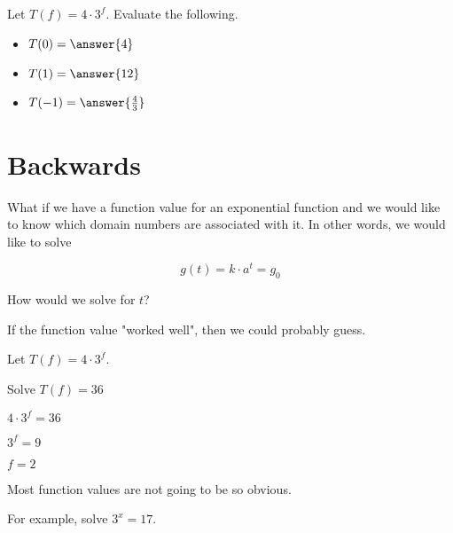 \documentclass{ximera}
\begin{document}
\begin{example}

Let $T(f) = 4 \cdot 3^f$.  Evaluate the following.

\begin{itemize}
\item $T(0) = \answer{4}$ 
\item $T(1) = \answer{12}$
\item $T(-1) = \answer{\frac{4}{3}}$
\end{itemize}
\end{example}























\section{Backwards}

What if we have a function value for an exponential function and we would like to know which domain numbers are associated with it.  In other words, we would like to solve


\[    g(t) = k \cdot a^t  =   g_0    \]


How would we solve for $t$?






\begin{example} If the function value "worked well", then we could probably guess.

Let $T(f) = 4 \cdot 3^f$.  


Solve $T(f) = 36$

$4 \cdot 3^f = 36$

$3^f = 9$

$f = 2$

\end{example}









Most function values are not going to be so obvious. 


For example, solve $ 3^x = 17$.
\end{document}
